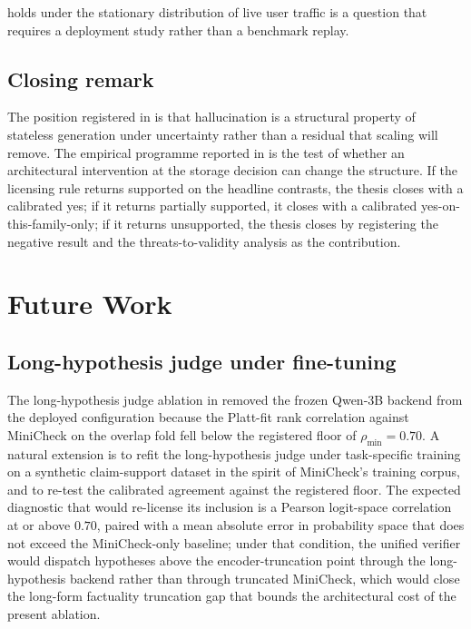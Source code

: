 holds under the stationary distribution of live user traffic is a question that requires a deployment study rather than a benchmark replay.

\subsection{Closing remark}
\label{sec:concl-closing}

The position registered in  is that hallucination is a structural property of stateless generation under uncertainty rather than a residual that scaling will remove. The empirical programme reported in  is the test of whether an architectural intervention at the storage decision can change the structure. If the licensing rule returns supported on the headline contrasts, the thesis closes with a calibrated yes; if it returns partially supported, it closes with a calibrated yes-on-this-family-only; if it returns unsupported, the thesis closes by registering the negative result and the threats-to-validity analysis as the contribution.

\section{Future Work}
\label{sec:future-work}

\subsection{Long-hypothesis judge under fine-tuning}
\label{sec:future-judge}

The long-hypothesis judge ablation in  removed the frozen Qwen-3B backend from the deployed configuration because the Platt-fit rank correlation against MiniCheck on the overlap fold fell below the registered floor of $\rho_{\min} = 0.70$. A natural extension is to refit the long-hypothesis judge under task-specific training on a synthetic claim-support dataset in the spirit of MiniCheck's training corpus, and to re-test the calibrated agreement against the registered floor. The expected diagnostic that would re-license its inclusion is a Pearson logit-space correlation at or above $0.70$, paired with a mean absolute error in probability space that does not exceed the MiniCheck-only baseline; under that condition, the unified verifier would dispatch hypotheses above the encoder-truncation point through the long-hypothesis backend rather than through truncated MiniCheck, which would close the long-form factuality truncation gap that bounds the architectural cost of the present ablation.

